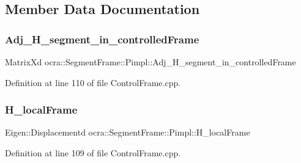 \subsection{Member Data Documentation}
\hypertarget{structocra_1_1SegmentFrame_1_1Pimpl_a3b188df19a7b138373a1861dfa5aad1d}{}\label{structocra_1_1SegmentFrame_1_1Pimpl_a3b188df19a7b138373a1861dfa5aad1d} 
\subsubsection{\texorpdfstring{Adj\+\_\+\+H\+\_\+segment\+\_\+in\+\_\+controlled\+Frame}{Adj\_H\_segment\_in\_controlledFrame}}
{\footnotesize\ttfamily Matrix\+Xd ocra\+::\+Segment\+Frame\+::\+Pimpl\+::\+Adj\+\_\+\+H\+\_\+segment\+\_\+in\+\_\+controlled\+Frame}



Definition at line 110 of file Control\+Frame.\+cpp.

\hypertarget{structocra_1_1SegmentFrame_1_1Pimpl_a5e0d767dc540fbd56b1e6f125ba7abf6}{}\label{structocra_1_1SegmentFrame_1_1Pimpl_a5e0d767dc540fbd56b1e6f125ba7abf6} 
\subsubsection{\texorpdfstring{H\+\_\+local\+Frame}{H\_localFrame}}
{\footnotesize\ttfamily Eigen\+::\+Displacementd ocra\+::\+Segment\+Frame\+::\+Pimpl\+::\+H\+\_\+local\+Frame}



Definition at line 109 of file Control\+Frame.\+cpp.

\hypertarget{structocra_1_1SegmentFrame_1_1Pimpl_aeeadbd2b42d3e0cf750cbc0df50f213c}{}\label{structocra_1_1SegmentFrame_1_1Pimpl_aeeadbd2b42d3e0cf750cbc0df50f213c} 
